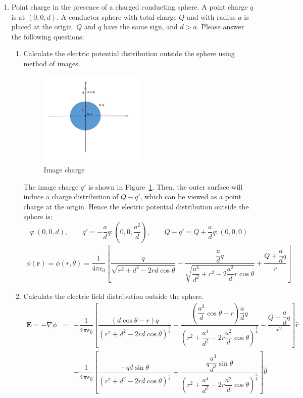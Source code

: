 \documentclass[a4paper,11pt]{article}
\begin{document}
\begin{enumerate}
  \item Point charge in the presence of a charged conducting sphere. A point charge $q$ is at $(0,0,d)$. A conductor sphere with total charge $Q$ and with radius $a$ is placed at the origin. $Q$ and $q$ have the same sign, and $d>a$. Please answer the following questions:
  \begin{enumerate}
    \item Calculate the electric potential distribution outside the sphere using method of images.
    \begin{figure}[h]
      \centering
      \includegraphics[width=0.5\textwidth]{fig1.png}\caption{Image charge}
      \label{fig1}
    \end{figure}

    The image charge $q'$ is shown in Figure~\ref{fig1}. Then, the outer surface will induce a charge distribution of $Q-q'$, which can be viewed as a point charge at the origin. Hence the electric potential distribution outside the sphere is:
    \begin{equation}
      q:(0,0,d),\quad \quad q'=-\dfrac{a}{d}q:(0,0,\dfrac{a^2}{d}),\quad \quad Q-q'=Q+\dfrac{a}{d}q:(0,0,0) \nonumber
    \end{equation}
    \begin{eqnarray}
      \phi(\boldsymbol{r})=\phi(r,\theta)=\dfrac{1}{4\pi\epsilon_0}\left[\dfrac{q}{\sqrt{r^2+d^2-2rd\cos\theta}}-\dfrac{\dfrac{a}{d}q}{\sqrt{\dfrac{a^4}{d^2}+r^2-2\dfrac{a^2}{d}r\cos\theta}}+\dfrac{Q+\dfrac{a}{d}q}{r}\right]
    \end{eqnarray}

    \item Calculate the electric field distribution outside the sphere.
    \begin{eqnarray}
      \boldsymbol{E}=-\nabla\phi&=&-\dfrac{1}{4\pi\epsilon_0}\left[\dfrac{(d\cos\theta-r)q}{(r^2+d^2-2rd\cos\theta)^{\frac{3}{2}}}-\dfrac{(\dfrac{a^2}{d}\cos\theta-r)\dfrac{a}{d}q}{{(r^2+\dfrac{a^4}{d^2}-2r\dfrac{a^2}{d}\cos\theta)}^{\frac{3}{2}}}-\dfrac{Q+\dfrac{a}{d}q}{r^2}\right]\hat{r}\nonumber \\
      &&-\dfrac{1}{4\pi\epsilon_0}\left[\dfrac{-qd\sin\theta}{{(r^2+d^2-2rd\cos\theta)}^{\frac{3}{2}}}+\dfrac{q\dfrac{a^3}{d^2}\sin\theta}{{(r^2+\dfrac{a^4}{d^2}-2r\dfrac{a^2}{d}\cos\theta)}^{\frac{3}{2}}}\right]\hat{\theta}
    \end{eqnarray}


\end{enumerate}
\end{enumerate}
\end{document}

